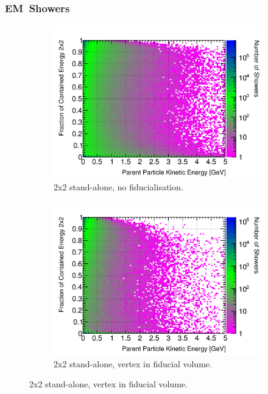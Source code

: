 \documentclass[10pt,a4paper,openany]{article}
\begin{document}
\subsubsection{EM~Showers}
\begin{figure}[htbp]
	\centering
	\begin{subfigure}[b]{0.49\textwidth}
		\centering
		\includegraphics[width=1.0\textwidth]{EM_contained_frac_2x2.png}
		\caption{2x2 stand-alone, no fiducialisation.}
		\label{}
	\end{subfigure}	
	\hfill
	\begin{subfigure}[b]{0.49\textwidth}
		\centering
    \includegraphics[width=1.0\textwidth]{EM_contained_frac_2x2_fiducial.png}
		\caption{2x2 stand-alone, vertex in fiducial volume.}
		\label{}

\end{subfigure}
\end{figure}
\end{document}
